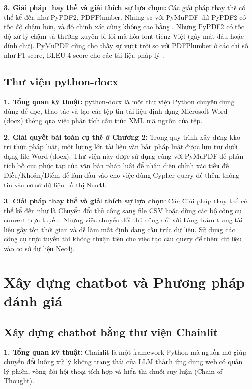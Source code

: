 \documentclass[../DoAn.tex]{subfiles}
\begin{document}
\textbf{3. Giải pháp thay thế và giải thích sự lựa chọn:}
Các giải pháp thay thế có thể kể đến như PyPDF2, PDFPlumber. Nhưng so với PyMuPDF thì PyPDF2 có tốc độ chậm hơn, và độ chính xác cũng không cao bằng \cite{paudel2026optimizingnepalipdfextraction}. Nhưng PyPDF2 có tốc độ xử lý chậm và thường xuyên bị lỗi mã hóa font tiếng Việt (gây mất dấu hoặc dính chữ). PyMuPDF cũng cho thấy sự vượt trội so với PDFPlumber ở các chỉ số như F1 score, BLEU-4 score cho các tài liệu pháp lý \cite{adhikari2025comparativestudypdfparsing}. 

\subsection{Thư viện python-docx}
\label{subsection:3.3.2}

\textbf{1. Tổng quan kỹ thuật:}
python-docx là một thư viện Python chuyên dụng dùng để đọc, thao tác và tạo các tệp tin tài liệu định dạng Microsoft Word (docx) thông qua việc phân tích cấu trúc XML mã nguồn của tệp.

\textbf{2. Giải quyết bài toán cụ thể ở Chương 2:}
Trong quy trình xây dựng kho tri thức pháp luật, một lượng lớn tài liệu văn bản pháp luật được lưu trữ dưới dạng file Word (docx). Thư viện này được sử dụng cùng với PyMuPDF để phân tích bố cục phức tạp của văn bản pháp luật để nhận diện chính xác tiêu đề Điều/Khoản/Điểm để làm đầu vào cho việc dùng Cypher query để thêm thông tin vào cơ sở dữ liệu đồ thị Neo4J.

\textbf{3. Giải pháp thay thế và giải thích sự lựa chọn:}
Các Giải pháp thay thế có thể kể đến như là Chuyển đổi thủ công sang file CSV hoặc dùng các bộ công cụ convert trực tuyến. Nhưng việc chuyển đổi thủ công đối với hàng trăm trang tài liệu gây tốn thời gian và dễ làm mất định dạng cấu trúc dữ liệu. Sử dụng các công cụ trực tuyến thì không thuận tiện cho việc tạo câu query để thêm dữ liệu vào cơ sở dữ liệu Neo4j.

\section{Xây dựng chatbot và Phương pháp đánh giá}
\label{section:3.4}

\subsection{Xây dựng chatbot bằng thư viện Chainlit}
\label{subsection:3.4.1}

\textbf{1. Tổng quan kỹ thuật:}
Chainlit là một framework Python mã nguồn mở giúp chuyển đổi luồng xử lý không trạng thái của LLM thành ứng dụng web có quản lý phiên, vòng đời hội thoại tích hợp và hiển thị chuỗi suy luận (Chain of Thought).
\end{document}
